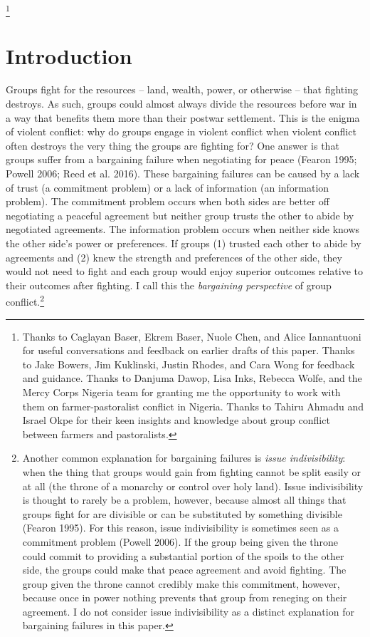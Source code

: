 \documentclass[11pt]{article}
\begin{document}
\newcommand\blfootnote[1]{%
  \begingroup
  \renewcommand\thefootnote{}\footnote{#1}%
  \addtocounter{footnote}{-1}%
  \endgroup
}
\singlespacing\blfootnote{Thanks to Caglayan Baser, Ekrem Baser, Nuole Chen, and Alice Iannantuoni
for useful conversations and feedback on earlier drafts of this paper.
Thanks to Jake Bowers, Jim Kuklinski, Justin Rhodes, and Cara Wong for
feedback and guidance. Thanks to Danjuma Dawop, Lisa Inks, Rebecca
Wolfe, and the Mercy Corps Nigeria team for granting me the opportunity
to work with them on farmer-pastoralist conflict in Nigeria. Thanks to
Tahiru Ahmadu and Israel Okpe for their keen insights and knowledge
about group conflict between farmers and pastoralists.}

\newpage

\hypertarget{introduction}{%
\section{Introduction}\label{introduction}}

Groups fight for the resources -- land, wealth, power, or otherwise --
that fighting destroys. As such, groups could almost always divide the
resources before war in a way that benefits them more than their postwar
settlement. This is the enigma of violent conflict: why do groups engage
in violent conflict when violent conflict often destroys the very thing
the groups are fighting for? One answer is that groups suffer from a
bargaining failure when negotiating for peace (Fearon 1995; Powell 2006;
Reed et al. 2016). These bargaining failures can be caused by a lack of
trust (a commitment problem) or a lack of information (an information
problem). The commitment problem occurs when both sides are better off
negotiating a peaceful agreement but neither group trusts the other to
abide by negotiated agreements. The information problem occurs when
neither side knows the other side's power or preferences. If groups (1)
trusted each other to abide by agreements and (2) knew the strength and
preferences of the other side, they would not need to fight and each
group would enjoy superior outcomes relative to their outcomes after
fighting. I call this the \emph{bargaining perspective} of group
conflict.\footnote{Another common explanation for bargaining failures is
  \emph{issue indivisibility}: when the thing that groups would gain
  from fighting cannot be split easily or at all (the throne of a
  monarchy or control over holy land). Issue indivisibility is thought
  to rarely be a problem, however, because almost all things that groups
  fight for are divisible or can be substituted by something divisible
  (Fearon 1995). For this reason, issue indivisibility is sometimes seen
  as a commitment problem (Powell 2006). If the group being given the
  throne could commit to providing a substantial portion of the spoils
  to the other side, the groups could make that peace agreement and
  avoid fighting. The group given the throne cannot credibly make this
  commitment, however, because once in power nothing prevents that group
  from reneging on their agreement. I do not consider issue
  indivisibility as a distinct explanation for bargaining failures in
  this paper.}
\end{document}
